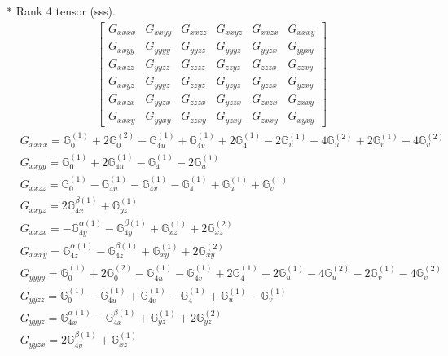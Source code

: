 \documentclass[fleqn,8pt,landscape]{jsarticle}
\begin{document}
* Rank 4 tensor (sss).
\begin{align*}
\begin{bmatrix} G_{xxxx} & G_{xxyy} & G_{xxzz} & G_{xxyz} & G_{xxzx} & G_{xxxy} \\ G_{xxyy} & G_{yyyy} & G_{yyzz} & G_{yyyz} & G_{yyzx} & G_{yyxy} \\ G_{xxzz} & G_{yyzz} & G_{zzzz} & G_{zzyz} & G_{zzzx} & G_{zzxy} \\ G_{xxyz} & G_{yyyz} & G_{zzyz} & G_{yzyz} & G_{yzzx} & G_{yzxy} \\ G_{xxzx} & G_{yyzx} & G_{zzzx} & G_{yzzx} & G_{zxzx} & G_{zxxy} \\ G_{xxxy} & G_{yyxy} & G_{zzxy} & G_{yzxy} & G_{zxxy} & G_{xyxy} \end{bmatrix}
\end{align*}
\begin{align*}
& G_{xxxx} = \mathbb{G}_{0}^{(1)} + 2 \mathbb{G}_{0}^{(2)} - \mathbb{G}_{4u}^{(1)} + \mathbb{G}_{4v}^{(1)} + 2 \mathbb{G}_{4}^{(1)} - 2 \mathbb{G}_{u}^{(1)} - 4 \mathbb{G}_{u}^{(2)} + 2 \mathbb{G}_{v}^{(1)} + 4 \mathbb{G}_{v}^{(2)} \\
& G_{xxyy} = \mathbb{G}_{0}^{(1)} + 2 \mathbb{G}_{4u}^{(1)} - \mathbb{G}_{4}^{(1)} - 2 \mathbb{G}_{u}^{(1)} \\
& G_{xxzz} = \mathbb{G}_{0}^{(1)} - \mathbb{G}_{4u}^{(1)} - \mathbb{G}_{4v}^{(1)} - \mathbb{G}_{4}^{(1)} + \mathbb{G}_{u}^{(1)} + \mathbb{G}_{v}^{(1)} \\
& G_{xxyz} = 2 \mathbb{G}_{4x}^{\beta(1)} + \mathbb{G}_{yz}^{(1)} \\
& G_{xxzx} = - \mathbb{G}_{4y}^{\alpha(1)} - \mathbb{G}_{4y}^{\beta(1)} + \mathbb{G}_{xz}^{(1)} + 2 \mathbb{G}_{xz}^{(2)} \\
& G_{xxxy} = \mathbb{G}_{4z}^{\alpha(1)} - \mathbb{G}_{4z}^{\beta(1)} + \mathbb{G}_{xy}^{(1)} + 2 \mathbb{G}_{xy}^{(2)} \\
& G_{yyyy} = \mathbb{G}_{0}^{(1)} + 2 \mathbb{G}_{0}^{(2)} - \mathbb{G}_{4u}^{(1)} - \mathbb{G}_{4v}^{(1)} + 2 \mathbb{G}_{4}^{(1)} - 2 \mathbb{G}_{u}^{(1)} - 4 \mathbb{G}_{u}^{(2)} - 2 \mathbb{G}_{v}^{(1)} - 4 \mathbb{G}_{v}^{(2)} \\
& G_{yyzz} = \mathbb{G}_{0}^{(1)} - \mathbb{G}_{4u}^{(1)} + \mathbb{G}_{4v}^{(1)} - \mathbb{G}_{4}^{(1)} + \mathbb{G}_{u}^{(1)} - \mathbb{G}_{v}^{(1)} \\
& G_{yyyz} = \mathbb{G}_{4x}^{\alpha(1)} - \mathbb{G}_{4x}^{\beta(1)} + \mathbb{G}_{yz}^{(1)} + 2 \mathbb{G}_{yz}^{(2)} \\
& G_{yyzx} = 2 \mathbb{G}_{4y}^{\beta(1)} + \mathbb{G}_{xz}^{(1)} \\

\end{align*}
\end{document}
